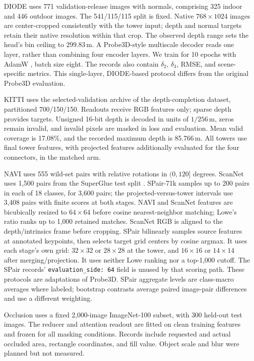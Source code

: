 DIODE uses 771 validation-release images with normals, comprising 325 indoor and
446 outdoor images. The 541/115/115 split is fixed. Native $768\times1024$ images are
center-cropped consistently with the tower input; depth and normal targets retain their
native resolution within that crop. The observed depth range sets the head's bin ceiling
to 299.83\,m. A Probe3D-style multiscale decoder \citep{elbanani2024probe3d,ranftl2021dpt}
reads one layer, rather than combining four encoder layers. We train for 10 epochs with
AdamW \citep{loshchilov2019adamw}, batch size eight. The records also contain
$\delta_2$, $\delta_3$, RMSE, and scene-specific metrics. This single-layer, DIODE-based
protocol differs from the original Probe3D evaluation.

KITTI uses the selected-validation archive of the depth-completion dataset, partitioned
700/150/150. Readouts receive RGB features only; sparse depth provides targets.
Unsigned 16-bit depth is decoded in units of $1/256$\,m, zeros remain invalid, and
invalid pixels are masked in loss and evaluation. Mean valid coverage is 17.08\%, and
the recorded maximum depth is 85.766\,m. All towers use final tower features, with
projected features additionally evaluated for the four connectors, in the matched arm.

NAVI uses 555 wild-set pairs with relative rotations in $(0,120]$ degrees. ScanNet uses
1,500 pairs from the SuperGlue test split \citep{sarlin2020superglue}. SPair-71k samples
up to 200 pairs in each of 18 classes, for 3,600 pairs; the projected-versus-tower
intervals use 3,408 pairs with finite scores at both stages. NAVI and ScanNet features
are bicubically resized to $64\times64$ before cosine nearest-neighbor matching;
Lowe's ratio \citep{lowe2004distinctive} ranks up to 1,000 retained matches. ScanNet RGB
is aligned to the depth/intrinsics frame before cropping. SPair bilinearly samples
source features at annotated keypoints, then selects target grid centers by cosine argmax.
It uses each stage's own grid: $32\times32$ or $28\times28$ at the tower, and
$16\times16$ or $14\times14$ after merging/projection. It uses neither Lowe ranking nor
a top-1,000 cutoff. The SPair records' \texttt{evaluation\_side: 64} field is unused by
that scoring path. These protocols are adaptations of Probe3D. SPair aggregate levels are class-macro averages where labeled; bootstrap
contrasts average paired image-pair differences and use a different weighting.

Occlusion uses a fixed 2,000-image ImageNet-100 subset, with 300 held-out test images.
The reducer and attention readout are fitted on clean training features and frozen for
all masking conditions. Records include requested and actual occluded area, rectangle
coordinates, and fill value. Object scale and blur were planned but not measured.

